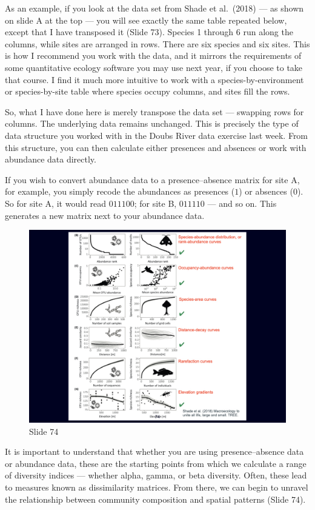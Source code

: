 \documentclass[
  10pt,
]{book}
\begin{document}
As an example, if you look at the data set from Shade et al.~(2018) ---
as shown on slide A at the top --- you will see exactly the same table
repeated below, except that I have transposed it (Slide 73). Species 1
through 6 run along the columns, while sites are arranged in rows. There
are six species and six sites. This is how I recommend you work with the
data, and it mirrors the requirements of some quantitative ecology
software you may use next year, if you choose to take that course. I
find it much more intuitive to work with a species-by-environment or
species-by-site table where species occupy columns, and sites fill the
rows.

So, what I have done here is merely transpose the data set --- swapping
rows for columns. The underlying data remains unchanged. This is
precisely the type of data structure you worked with in the Doubs River
data exercise last week. From this structure, you can then calculate
either presences and absences or work with abundance data directly.

If you wish to convert abundance data to a presence--absence matrix for
site A, for example, you simply recode the abundances as presences
(\(1\)) or absences (\(0\)). So for site A, it would read \(011100\);
for site B, \(011110\) --- and so on. This generates a new matrix next
to your abundance data.

\begin{figure}[ht]
\centering
\includegraphics[width=0.8\linewidth]{../images/BDC334/BDC334-074.jpeg}
\caption*{Slide 74}
\end{figure}

It is important to understand that whether you are using
presence--absence data or abundance data, these are the starting points
from which we calculate a range of diversity indices --- whether alpha,
gamma, or beta diversity. Often, these lead to measures known as
dissimilarity matrices. From there, we can begin to unravel the
relationship between community composition and spatial patterns (Slide
74).
\end{document}

